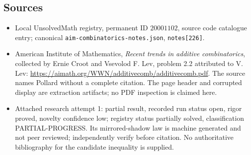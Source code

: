 \documentclass[11pt]{article}
\begin{document}
\subsection{Sources}
\begin{itemize}
\item Local UnsolvedMath registry, permanent ID $20001102$, source code catalogue entry; canonical \texttt{aim-combinatorics-notes.json}, \texttt{notes[226]}.
\item American Institute of Mathematics, \emph{Recent trends in additive combinatorics}, collected by Ernie Croot and Vsevolod F. Lev, problem 2.2 attributed to V. Lev: \url{https://aimath.org/WWN/additivecomb/additivecomb.pdf}. The source names Pollard without a complete citation. The page header and corrupted display are extraction artifacts; no PDF inspection is claimed here.
\item Attached research attempt 1: partial result, recorded run status open, rigor proved, novelty confidence low; registry status partially solved, classification PARTIAL-PROGRESS. Its mirrored-shadow law is machine generated and not peer reviewed; independently verify before citation. No authoritative bibliography for the candidate inequality is supplied.
\end{itemize}
\end{document}
